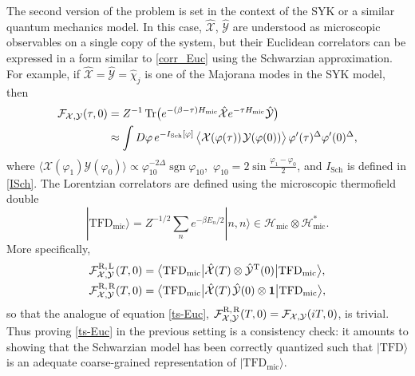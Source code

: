 \documentclass[11pt]{article}
\newcommand{\blangle}{\bigl\langle}
\newcommand{\brangle}{\bigr\rangle}
\newcommand*{\ket}[1]{|{#1}\rangle}
\newcommand*{\bbra}[1]{\blangle{#1}\big|}
\newcommand*{\bket}[1]{\big|{#1}\brangle}
\newcommand*{\corr}[1]{\langle{#1}\rangle}
\newcommand*{\bcorr}[1]{\blangle{#1}\brangle}
\newcommand{\vp}{\varphi}
\newcommand{\calF}{\mathcal{F}}
\newcommand{\calH}{\mathcal{H}}
\newcommand{\calX}{\mathcal{X}}
\newcommand{\calY}{\mathcal{Y}}
\DeclareMathOperator{\Tr}{Tr}
\DeclareMathOperator{\sgn}{sgn}
\newcommand{\Tt}{\mathrm{T}}
\DeclareMathOperator{\Sch}{Sch}
\newcommand{\la}{\text{L}}
\newcommand{\ra}{\text{R}}
\newcommand{\TFD}{\mathrm{TFD}}
\newcommand{\unit}{\mathbf{1}}
\begin{document}
The second version of the problem is set in the context of the SYK or a similar quantum mechanics model. In this case, $\hat{\calX}$, $\hat{\calY}$ are understood as microscopic observables on a single copy of the system, but their Euclidean correlators can be expressed in a form similar to \eqref{corr_Euc} using the Schwarzian approximation. For example, if $\hat{\calX}=\hat{\calY}=\hat{\chi}_j$ is one of the Majorana modes in the SYK model, then
\begin{equation}
\begin{aligned}
\calF_{\calX,\calY}(\tau,0)
&=Z^{-1}\Tr\bigl(e^{-(\beta-\tau)H_{\text{mic}}}\hat{\calX}
e^{-\tau H_{\text{mic}}}\hat{\calY}\bigr)\\
&\approx\int D\vp\,e^{-I_{\Sch}[\vp]}\,
\bcorr{\calX(\vp(\tau))\kern1pt\calY(\vp(0))}\,
\vp'(\tau)^{\Delta}\vp'(0)^{\Delta},
\end{aligned}
\end{equation}
where $\corr{\calX(\vp_1)\calY(\vp_0)} \propto \vp_{10}^{-2\Delta}\sgn\vp_{10}$,\, $\vp_{10}=2\sin\frac{\vp_1-\vp_0}{2}$, and $I_{\Sch}$ is defined in \eqref{ISch}. The Lorentzian correlators are defined using the microscopic thermofield double
\begin{equation}
\ket{\TFD_{\text{mic}}}=Z^{-1/2}\sum_{n}e^{-\beta E_n/2}\ket{n,n}
\in\calH_{\text{mic}}\otimes\calH_{\text{mic}}^{*}.
\end{equation}
More specifically,
\begin{align}
\label{two-sided-mic}
\tensor*{\calF}{*^{\ra,}_{\calX,}^{\la}_{\calY}}(T,0)
&=\bbra{\TFD_\text{mic}}\hat{\calX}(T)\otimes\hat{\calY}^{\Tt}(0)
\bket{\TFD_\text{mic}},
\\
\label{one-sided-mic}
\tensor*{\calF}{*^{\ra,}_{\calX,}^{\ra}_{\calY}}(T,0)
&=\bbra{\TFD_\text{mic}}\hat{\calX}(T)\kern1pt\hat{\calY}(0)
\otimes \unit\bket{\TFD_\text{mic}},
\end{align}
so that the analogue of equation \eqref{ts-Euc}, $\tensor*{\calF}{*^{\ra,}_{\calX,}^{\ra}_{\calY}}(T,0)=\calF_{\calX, \calY}(iT,0)$, is trivial. Thus proving \eqref{ts-Euc} in the previous setting is a consistency check: it amounts to showing that the Schwarzian model has been correctly quantized such that $\ket{\TFD}$ is an adequate coarse-grained representation of $\ket{\TFD_{\text{mic}}}$.
\end{document}
